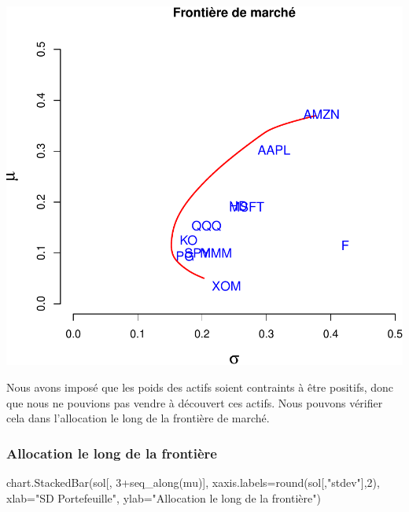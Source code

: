 \documentclass[
]{article}
\newenvironment{Shaded}{\begin{snugshade}}{\end{snugshade}}
\newcommand{\AttributeTok}[1]{\textcolor[rgb]{0.77,0.63,0.00}{#1}}
\newcommand{\DecValTok}[1]{\textcolor[rgb]{0.00,0.00,0.81}{#1}}
\newcommand{\FunctionTok}[1]{\textcolor[rgb]{0.00,0.00,0.00}{#1}}
\newcommand{\NormalTok}[1]{#1}
\newcommand{\SpecialCharTok}[1]{\textcolor[rgb]{0.00,0.00,0.00}{#1}}
\newcommand{\StringTok}[1]{\textcolor[rgb]{0.31,0.60,0.02}{#1}}
\begin{document}
\includegraphics{TP-2_files/figure-latex/unnamed-chunk-5-1.pdf}

Nous avons imposé que les poids des actifs soient contraints à être
positifs, donc que nous ne pouvions pas vendre à découvert ces actifs.
Nous pouvons vérifier cela dans l'allocation le long de la frontière de
marché.

\hypertarget{allocation-le-long-de-la-frontiuxe8re}{%
\subsubsection{Allocation le long de la
frontière}\label{allocation-le-long-de-la-frontiuxe8re}}

\begin{Shaded}
\begin{Highlighting}[]
\FunctionTok{chart.StackedBar}\NormalTok{(sol[, }\DecValTok{3}\SpecialCharTok{+}\FunctionTok{seq\_along}\NormalTok{(mu)], }\AttributeTok{xaxis.labels=}\FunctionTok{round}\NormalTok{(sol[,}\StringTok{"stdev"}\NormalTok{],}\DecValTok{2}\NormalTok{), }
                 \AttributeTok{xlab=}\StringTok{"SD Portefeuille"}\NormalTok{, }\AttributeTok{ylab=}\StringTok{"Allocation le long de la frontière"}\NormalTok{)}
\end{Highlighting}
\end{Shaded}
\end{document}

